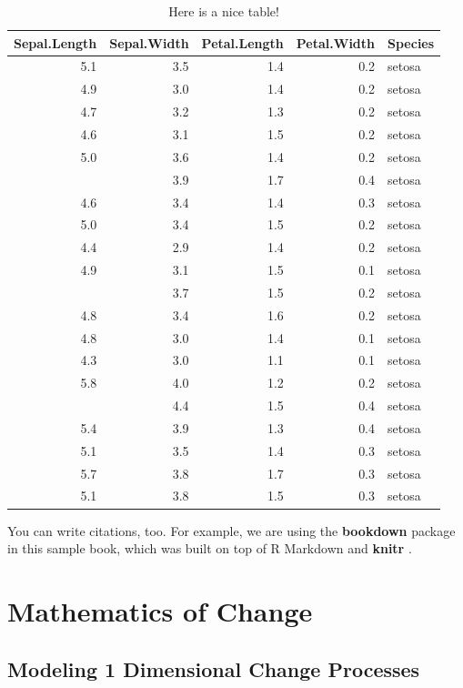\documentclass[12pt,]{book}
\theoremstyle{definition}
\theoremstyle{definition}
\theoremstyle{definition}
\theoremstyle{remark}
\begin{document}
\begin{table}

\caption{\label{tab:nice-tab}Here is a nice table!}
\centering
\begin{tabular}[t]{rrrrl}
\toprule
Sepal.Length & Sepal.Width & Petal.Length & Petal.Width & Species\\
\midrule
5.1 & 3.5 & 1.4 & 0.2 & setosa\\
4.9 & 3.0 & 1.4 & 0.2 & setosa\\
4.7 & 3.2 & 1.3 & 0.2 & setosa\\
4.6 & 3.1 & 1.5 & 0.2 & setosa\\
5.0 & 3.6 & 1.4 & 0.2 & setosa\\
\addlinespace
5.4 & 3.9 & 1.7 & 0.4 & setosa\\
4.6 & 3.4 & 1.4 & 0.3 & setosa\\
5.0 & 3.4 & 1.5 & 0.2 & setosa\\
4.4 & 2.9 & 1.4 & 0.2 & setosa\\
4.9 & 3.1 & 1.5 & 0.1 & setosa\\
\addlinespace
5.4 & 3.7 & 1.5 & 0.2 & setosa\\
4.8 & 3.4 & 1.6 & 0.2 & setosa\\
4.8 & 3.0 & 1.4 & 0.1 & setosa\\
4.3 & 3.0 & 1.1 & 0.1 & setosa\\
5.8 & 4.0 & 1.2 & 0.2 & setosa\\
\addlinespace
5.7 & 4.4 & 1.5 & 0.4 & setosa\\
5.4 & 3.9 & 1.3 & 0.4 & setosa\\
5.1 & 3.5 & 1.4 & 0.3 & setosa\\
5.7 & 3.8 & 1.7 & 0.3 & setosa\\
5.1 & 3.8 & 1.5 & 0.3 & setosa\\
\bottomrule
\end{tabular}
\end{table}

You can write citations, too. For example, we are using the
\textbf{bookdown} package \citep{R-bookdown} in this sample book, which
was built on top of R Markdown and \textbf{knitr} \citep{xie2015}.

\part{Mathematics of
Change}\label{part-mathematics-of-change}

\chapter*{\texorpdfstring{\textbf{Modeling 1 Dimensional Change
Processes}}{Modeling 1 Dimensional Change Processes}}\label{modeling-1-dimensional-change-processes}
\end{document}
